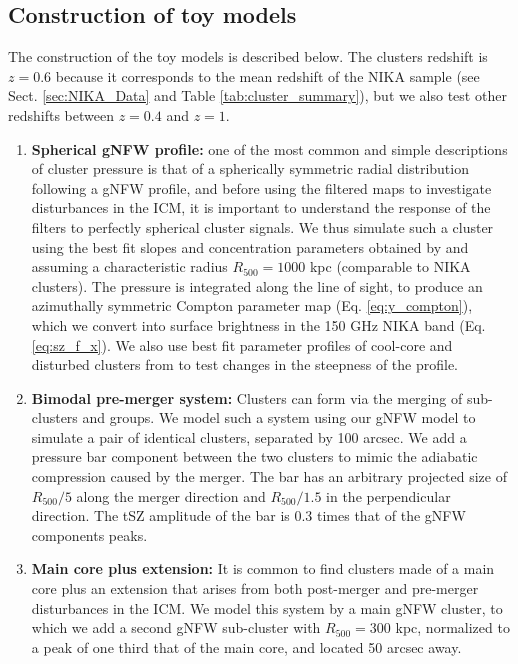 \documentclass[traditabstract]{aa}
\begin{document}
\subsection{Construction of toy models}
The construction of the toy models is described below. The clusters redshift is $z=0.6$ because it corresponds to the mean redshift of the NIKA sample (see Sect. \ref{sec:NIKA_Data} and Table \ref{tab:cluster_summary}), but we also test other redshifts between $z=0.4$ and $z=1$.
\begin{enumerate}
\item {\bf Spherical gNFW profile:} one of the most common and simple descriptions of cluster pressure is that of a spherically symmetric radial distribution following a gNFW \citep{Nagai2007} profile, and before using the filtered maps to investigate disturbances in the ICM, it is important to understand the response of the filters to perfectly spherical cluster signals. We thus simulate such a cluster using the best fit slopes and concentration parameters obtained by \cite{Planck2013V} and assuming a characteristic radius $R_{500} = 1000$ kpc (comparable to NIKA clusters). The pressure is integrated along the line of sight, to produce an azimuthally symmetric Compton parameter map (Eq. \ref{eq:y_compton}), which we convert into surface brightness in the 150 GHz NIKA band (Eq. \ref{eq:sz_f_x}). We also use best fit parameter profiles of cool-core and disturbed clusters from \cite{Arnaud2010} to test changes in the steepness of the profile.
\item {\bf Bimodal pre-merger system:} Clusters can form via the merging of sub-clusters and groups. We model such a system using our gNFW model to simulate a pair of identical clusters, separated by 100 arcsec. We add a pressure bar component between the two clusters to mimic the adiabatic compression caused by the merger. The bar has an arbitrary projected size of $R_{500}/5$ along the merger direction and $R_{500}/1.5$ in the perpendicular direction. The tSZ amplitude of the bar is 0.3 times that of the gNFW components peaks.
\item {\bf Main core plus extension:} It is common to find clusters made of a main core plus an extension that arises from both post-merger and pre-merger disturbances in the ICM. We model this system by a main gNFW cluster, to which we add a second gNFW sub-cluster with $R_{500} = 300$ kpc, normalized to a peak of one third that of the main core, and located 50 arcsec away.

\end{enumerate}
\end{document}
